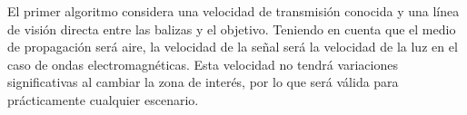 




El primer algoritmo considera una velocidad de transmisión conocida y una línea de visión directa entre las balizas y el objetivo.
Teniendo en cuenta que el medio de propagación será aire, la velocidad de la señal será la velocidad de la luz en el caso de ondas electromagnéticas.
Esta velocidad no tendrá variaciones significativas al cambiar la zona de interés, por lo que será válida para prácticamente cualquier escenario.

